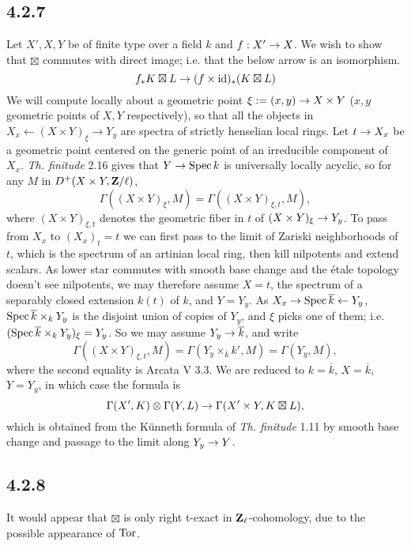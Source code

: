 \documentclass[deligne.tex]{subfiles}
\begin{document}
\subsection*{4.2.7}
Let $X',X,Y$ be of finite type over a field $k$ and $f:X'\rightarrow X$.
We wish to show that $\boxtimes$ commutes with direct image; i.e. that the
below arrow is an isomorphism.
\begin{equation*}
	f_*K\boxtimes L\rightarrow (f\times\operatorname{id})_*(K\boxtimes L)
\end{equation*}
We will compute locally about a geometric point
$\xi:=(x,y)\rightarrow X\times Y$ ($x,y$ geometric points of $X,Y$ respectively), 
so that all the objects in $X_x\leftarrow (X\times Y)_\xi\rightarrow Y_y$
are spectra of strictly henselian local rings.
Let $t\rightarrow X_x$ be a geometric point centered on the generic point of an
irreducible component of $X_x$.
\emph{Th. finitude} 2.16 gives that $Y\rightarrow\operatorname{Spec} k$ is universally locally
acyclic, so for any $M$ in $D^+(X\times Y,\mathbf{Z}/\ell)$,
\begin{equation*}
	\Gamma((X\times Y)_\xi,M)=\Gamma((X\times Y)_{\xi,t},M),
\end{equation*}
where $(X\times Y)_{\xi,t}$ denotes the geometric fiber in $t$ of
$(X\times Y)_\xi\rightarrow Y_y$. To pass from $X_x$ to $(X_x)_t=t$ we can first
pass to the limit of Zariski neighborhoods of $t$, which is the spectrum of 
an artinian local ring, then kill nilpotents and extend scalars. As lower
star commutes with smooth base change and the étale topology doesn't see
nilpotents, we may therefore assume 
$X=t$, the spectrum of a separably closed extension $k(t)$ of $k$, and 
$Y=Y_y$.
As $X_x\rightarrow\operatorname{Spec}\overline k\leftarrow Y_y$, $\operatorname{Spec}\overline k\times_k Y_y$ is 
the disjoint union of copies of $Y_y$, and $\xi$ picks one of them; i.e.
$(\operatorname{Spec}\overline k\times_k Y_y)_\xi=Y_y$. So we may assume
$Y_y\rightarrow\overline k$, and write
\begin{equation*}
	\Gamma((X\times Y)_{\xi,t},M)=\Gamma(Y_y\times_{\overline k}k',M)
	=\Gamma(Y_y,M),
\end{equation*}
where the second equality is Arcata V 3.3.
We are reduced to $k=\overline k$, $X=\overline k$, $Y=Y_y$, in which case
the formula is
\begin{equation*}
	\Gamma(X',K)\otimes\Gamma(Y,L)\rightarrow\Gamma(X'\times Y,K\boxtimes L),
\end{equation*}
which is obtained from the Künneth formula of \emph{Th. finitude} 1.11 by
smooth base change and passage to the limit along $Y_y\rightarrow Y$.

\subsection*{4.2.8} It would appear that $\boxtimes$ is only right t-exact
in $\mathbf{Z}_\ell$-cohomology, due to the possible appearance of $\operatorname{Tor}$.
\end{document}
